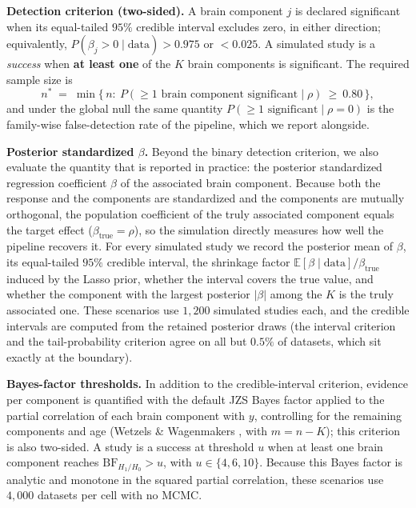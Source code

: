 \documentclass[11pt,a4paper]{article}
\newcommand{\BF}{\mathrm{BF}}
\begin{document}
\textbf{Detection criterion (two-sided).} A brain component $j$ is declared significant when its equal-tailed $95\%$ credible interval excludes zero, in either direction; equivalently, $P(\beta_j>0\mid\text{data})>0.975$ or $<0.025$. A simulated study is a \emph{success} when \textbf{at least one} of the $K$ brain components is significant. The required sample size is
\begin{equation}
n^{*} \;=\; \min\bigl\{\,n:\ P(\text{$\ge1$ brain component significant}\mid\rho)\ \ge\ 0.80\,\bigr\},
\end{equation}
and under the global null the same quantity $P(\ge1\text{ significant}\mid\rho=0)$ is the family-wise false-detection rate of the pipeline, which we report alongside.

\textbf{Posterior standardized $\beta$.} Beyond the binary detection criterion, we also evaluate the quantity that is reported in practice: the posterior standardized regression coefficient $\beta$ of the associated brain component. Because both the response and the components are standardized and the components are mutually orthogonal, the population coefficient of the truly associated component equals the target effect ($\beta_{\mathrm{true}}=\rho$), so the simulation directly measures how well the pipeline recovers it. For every simulated study we record the posterior mean of $\beta$, its equal-tailed $95\%$ credible interval, the shrinkage factor $\mathbb{E}[\beta\mid\text{data}]/\beta_{\mathrm{true}}$ induced by the Lasso prior, whether the interval covers the true value, and whether the component with the largest posterior $|\beta|$ among the $K$ is the truly associated one. These scenarios use $1{,}200$ simulated studies each, and the credible intervals are computed from the retained posterior draws (the interval criterion and the tail-probability criterion agree on all but $0.5\%$ of datasets, which sit exactly at the boundary).

\textbf{Bayes-factor thresholds.} In addition to the credible-interval criterion, evidence per component is quantified with the default JZS Bayes factor applied to the partial correlation of each brain component with $y$, controlling for the remaining components and age (Wetzels \& Wagenmakers \cite{wetzels2012}, with $m=n-K$); this criterion is also two-sided. A study is a success at threshold $u$ when at least one brain component reaches $\BF_{H_1/H_0}>u$, with $u\in\{4,6,10\}$. Because this Bayes factor is analytic and monotone in the squared partial correlation, these scenarios use $4{,}000$ datasets per cell with no MCMC.
\end{document}
